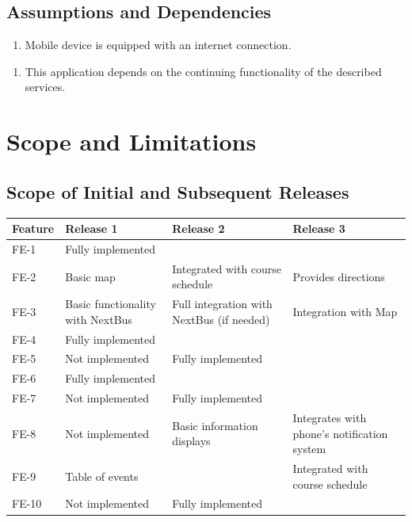 \documentclass[pdftex,12pt,letter]{article}
\begin{document}
\subsection{Assumptions and Dependencies}
\begin{enumerate}[{A}S-1:]
\item Mobile device is equipped with an internet connection.
\end{enumerate}
\begin{enumerate}[DE-1:]
\item This application depends on the continuing functionality of the described services.
\end{enumerate}
\section{Scope and Limitations}
\subsection{Scope of Initial and Subsequent Releases}
\begin{table}[h]
\begin{tabularx}{\textwidth }[t]{|l|Y|Y|Y|}
\hline
\bfseries Feature & \bfseries\hspace{1cm}Release 1 & \bfseries\hspace{1cm}Release 2 & \bfseries\hspace{1cm}Release 3 \\ \hline
FE-1 & Fully implemented & ~ & ~ \\ \hline
FE-2 & Basic map & Integrated with course schedule & Provides directions \\ \hline
FE-3 & Basic functionality with NextBus & Full integration with NextBus (if needed) & Integration with Map \\ \hline
FE-4 & Fully implemented & ~ & ~ \\ \hline
FE-5 & Not implemented & Fully implemented & ~ \\ \hline
FE-6 & Fully implemented & ~ & ~ \\ \hline
FE-7 & Not implemented & Fully implemented & ~ \\ \hline
FE-8 & Not implemented & Basic information displays & Integrates with phone's notification system \\ \hline
FE-9 & Table of events & ~ & Integrated with course schedule \\ \hline
FE-10 & Not implemented & Fully implemented & ~ \\
\hline
\end{tabularx}
\end{table}
\end{document}

